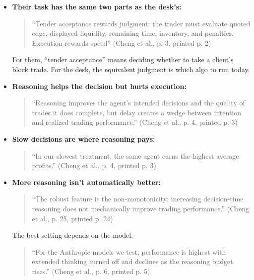 \documentclass{article}
\begin{document}
\begin{itemize}

\item \textbf{Their task has the same two parts as the desk's:}

\begin{quote}``Tender acceptance rewards judgment: the trader must evaluate quoted edge, displayed liquidity, remaining time, inventory, and penalties. Execution rewards speed'' (Cheng et al., p. 3, printed p. 2)\end{quote}

For them, ``tender acceptance'' means deciding whether to take a client's block trade. For the desk, the equivalent judgment is which algo to run today.

\item \textbf{Reasoning helps the decision but hurts execution:}

\begin{quote}``Reasoning improves the agent's intended decisions and the quality of trades it does complete, but delay creates a wedge between intention and realized trading performance.'' (Cheng et al., p. 4, printed p. 3)\end{quote}

\item \textbf{Slow decisions are where reasoning pays:}

\begin{quote}``In our slowest treatment, the same agent earns the highest average profits.'' (Cheng et al., p. 4, printed p. 3)\end{quote}

\item \textbf{More reasoning isn't automatically better:}

\begin{quote}``The robust feature is the non-monotonicity: increasing decision-time reasoning does not mechanically improve trading performance.'' (Cheng et al., p. 25, printed p. 24)\end{quote}

The best setting depends on the model:

\begin{quote}``For the Anthropic models we test, performance is highest with extended thinking turned off and declines as the reasoning budget rises.'' (Cheng et al., p. 6, printed p. 5)\end{quote}

\end{itemize}
\end{document}
